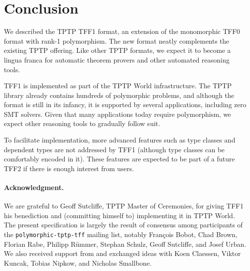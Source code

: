 \section{Conclusion}
\label{sec_concl}

We described the TPTP TFF1 format, an extension of the monomorphic TFF0 format
with rank-1 polymorphism. The new format neatly complements the existing TPTP
offering. Like other TPTP formats, we expect it to become a lingua franca for
automatic theorem provers and other automated reasoning tools.

TFF1 is implemented as part of the TPTP World infrastructure. The TPTP library
already contains hundreds of polymorphic problems, and although the format is
still in its infancy, it is supported by several applications, including zero
SMT solvers. Given that many applications today require polymorphism, we expect
other reasoning tools to gradually follow suit.

To facilitate implementation, more advanced features such as type classes and
dependent types are not addressed by TFF1 (although type classes can be
comfortably encoded in it). These features are expected to be part of a future
TFF2 if there is enough interest from users.

\def\ackname{Acknowledgment}
\paragraph{\textbf{\upshape\ackname.}}
%
We are grateful to Geoff Sutcliffe, TPTP Master of Ceremonies, for giving TFF1
his benediction and (committing himself to) implementing it in TPTP World. The
present specification is largely the result of consensus among participants of
the {\tt polymorphic-tptp-tff} mailing list, notably Fran\c{c}ois Bobot, Chad
Brown, Florian Rabe, Philipp R\"ummer, Stephan Schulz, Geoff Sutcliffe, and
Josef Urban. We also received support from and exchanged ideas with Koen
Claessen, Viktor Kuncak, Tobias Nipkow, and Nicholas Smallbone.
